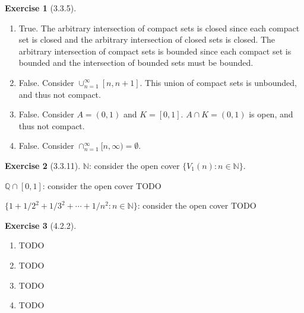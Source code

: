 \documentclass{amsart}
\theoremstyle{definition}
\newtheorem{exercise}{Exercise}
\newcommand{\N}{\mathbb{N}}
\newcommand{\Q}{\mathbb{Q}}
\newcommand{\st}{\mathrel{:}}
\begin{document}
\begin{exercise}[3.3.5]
  \begin{enumerate}[label={(\alph*)}]
    \item True. The arbitrary intersection of compact sets is closed since each
      compact set is closed and the arbitrary intersection of closed sets is
      closed. The arbitrary intersection of compact sets is bounded since each
      compact set is bounded and the intersection of bounded sets must be
      bounded.
    \item False. Consider $\cup_{n=1}^\infty [n, n+1]$. This union of compact
      sets is unbounded, and thus not compact.
    \item False. Consider $A = (0, 1)$ and $K = [0, 1]$. $A \cap K = (0, 1)$ is
      open, and thus not compact.
    \item False. Consider $\cap_{n=1}^\infty \lbrack n, \infty \rparen =
      \emptyset$.
  \end{enumerate}
\end{exercise}

\begin{exercise}[3.3.11]
  $\N$: consider the open cover $\{V_1(n) \st n \in \N\}$.

  $\Q \cap [0, 1]$: consider the open cover TODO

  $\{1 + 1/2^2 + 1/3^2 + \cdots + 1/n^2 \st n \in \N\}$: consider the open cover
  TODO
\end{exercise}

\begin{exercise}[4.2.2]
  \begin{enumerate}[label={(\alph*)}]
    \item TODO
    \item TODO
    \item TODO
    \item TODO
  \end{enumerate}
\end{exercise}
\end{document}
